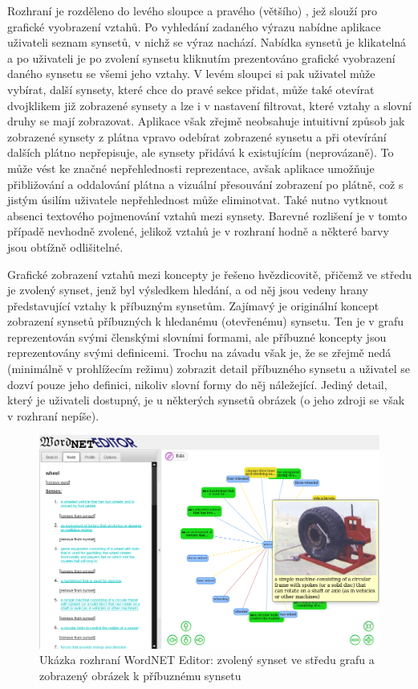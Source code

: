 \documentclass[a4paper, 11pt, oneside]{book}
\begin{document}
				Rozhraní je rozděleno do levého sloupce a pravého (většího) , jež slouží pro grafické vyobrazení vztahů. Po vyhledání zadaného výrazu nabídne aplikace uživateli seznam synsetů, v nichž se výraz nachází. Nabídka synsetů je klikatelná a po uživateli je po zvolení synsetu kliknutím prezentováno grafické vyobrazení daného synsetu se všemi jeho vztahy. V levém sloupci si pak uživatel může vybírat, další synsety, které chce do pravé sekce přidat, může také otevírat dvojklikem již zobrazené synsety a lze i v nastavení filtrovat, které vztahy a slovní druhy se mají zobrazovat. Aplikace však zřejmě neobsahuje intuitivní způsob jak zobrazené synsety z plátna vpravo odebírat zobrazené synsetu a při otevírání dalších plátno nepřepisuje, ale synsety přidává k existujícím (neprovázaně). To může vést ke značné nepřehlednosti reprezentace, avšak aplikace umožňuje přibližování a oddalování plátna a vizuální přesouvání zobrazení po plátně, což s jistým úsilím uživatele nepřehlednost může eliminotvat. Také nutno vytknout absenci textového pojmenování vztahů mezi synsety. Barevné rozlišení je v tomto případě nevhodně zvolené, jelikož vztahů je v rozhraní hodně a některé barvy jsou obtížně odlišitelné.

				Grafické zobrazení vztahů mezi koncepty je řešeno hvězdicovitě, přičemž ve středu je zvolený synset, jenž byl výsledkem hledání, a od něj jsou vedeny hrany představující vztahy k příbuzným synsetům. Zajímavý je originální koncept zobrazení synsetů příbuzných k hledanému (otevřenému) synsetu. Ten je v grafu reprezentován svými členskými slovními formami, ale příbuzné koncepty jsou reprezentovány svými definicemi. Trochu na závadu však je, že se zřejmě nedá (minimálně v prohlížecím režimu) zobrazit detail příbuzného synsetu a uživatel se dozví pouze jeho definici, nikoliv slovní formy do něj náležející. Jediný detail, který je uživateli dostupný, je u některých synsetů obrázek (o jeho zdroji se však v rozhraní nepíše).

				\begin{figure}[h]
					\centering
					\includegraphics[width=1.0\textwidth]{wneditor.png}
					\caption{Ukázka rozhraní WordNET Editor: zvolený synset ve středu grafu a zobrazený obrázek k příbuznému synsetu}
					\label{fig:wneditor}
				\end{figure}
\end{document}
